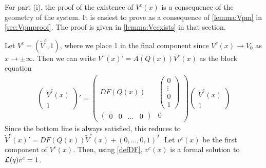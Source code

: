 \documentclass[thesis.tex]{subfiles}
\begin{document}
For part (i), the proof of the existence of $V^c(x)$ is a consequence of the geometry of the system. It is easiest to prove as a consequence of \cref{lemma:Vpm} in \cref{sec:Vpmproof}. The proof is given in \cref{lemma:Vcexists} in that section. 

Let $V^c = (\tilde{V}^c, 1)$, where we place 1 in the final component since $V^c(x) \rightarrow V_0$ as $x \rightarrow \pm \infty$. Then we can write $V^c(x)' = A(Q(x))V^c(x)$ as the block equation
\begin{align*}
\begin{pmatrix}\tilde{V}^c(x) \\ 1 \end{pmatrix}' = 
\begin{pmatrix}
DF(Q(x)) & \begin{pmatrix} 0 \\ \vdots \\ 0 \\ 1 \end{pmatrix} \\
\begin{pmatrix} 0 & 0 & \dots & 0 \end{pmatrix} & 0
\end{pmatrix} 
\begin{pmatrix}\tilde{V}^c(x) \\ 1 \end{pmatrix}
\end{align*}
Since the bottom line is always satisfied, this reduces to $\tilde{V}^c(x)' = DF(Q(x)) \tilde{V}^c(x) + (0, \dots, 0, 1)^T$. Let $v^c(x)$ be the first component of $V^c(x)$. Then, using \eqref{defDF}, $v^c(x)$ is a formal solution to $\mathcal{L}(q)v^c = 1$.
\end{document}
